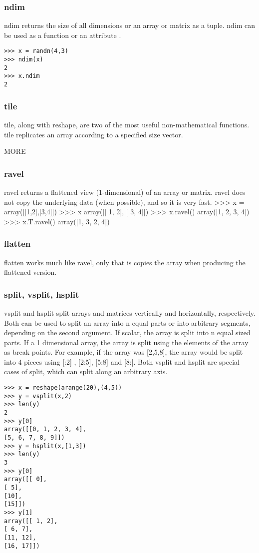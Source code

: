 \documentclass[KSmain.tex]{subfiles}
\begin{document}
\subsubsection{ndim}
ndim returns the size of all dimensions or an array or matrix as a tuple. ndim can be used as a function or
an attribute .
\begin{verbatim}
>>> x = randn(4,3)
>>> ndim(x)
2
>>> x.ndim
2
\end{verbatim}
\subsubsection{tile}
tile, along with reshape, are two of the most useful non-mathematical functions. tile replicates an array
according to a specified size vector. 

MORE
\subsubsection{ravel}
ravel returns a flattened view (1-dimensional) of an array or matrix. ravel does not copy the underlying
data (when possible), and so it is very fast.
>>> x = array([[1,2],[3,4]])
>>> x
array([[ 1, 2],
[ 3, 4]])
>>> x.ravel()
array([1, 2, 3, 4])
>>> x.T.ravel()
array([1, 3, 2, 4])
\subsubsection{flatten}
flatten works much like ravel, only that is copies the array when producing the flattened version.



\subsubsection{split, vsplit, hsplit}
vsplit and hsplit split arrays and matrices vertically and horizontally, respectively. Both can be used to
split an array into n equal parts or into arbitrary segments, depending on the second argument. If scalar,
the array is split into n equal sized parts. If a 1 dimensional array, the array is split using the elements of
the array as break points. For example, if the array was [2,5,8], the array would be split into 4 pieces using
[:2] , [2:5], [5:8] and [8:]. Both vsplit and hsplit are special cases of split, which can split along an
arbitrary axis.
\begin{framed}
\begin{verbatim}
>>> x = reshape(arange(20),(4,5))
>>> y = vsplit(x,2)
>>> len(y)
2
>>> y[0]
array([[0, 1, 2, 3, 4],
[5, 6, 7, 8, 9]])
>>> y = hsplit(x,[1,3])
>>> len(y)
3
>>> y[0]
array([[ 0],
[ 5],
[10],
[15]])
>>> y[1]
array([[ 1, 2],
[ 6, 7],
[11, 12],
[16, 17]])
\end{verbatim}
\end{framed}
\end{document}
